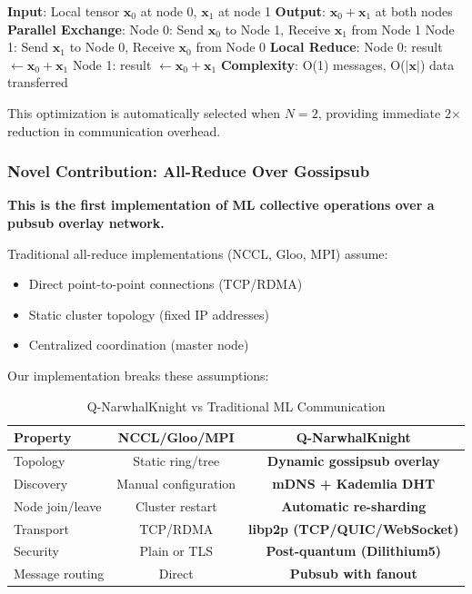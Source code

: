 \documentclass[11pt,a4paper]{article}
\newcommand{\vect}[1]{\mathbf{#1}}
\begin{document}
\begin{algorithm}[H]
\caption{2-Node Direct Exchange All-Reduce}
\begin{algorithmic}[1]
\STATE \textbf{Input}: Local tensor $\vect{x}_0$ at node 0, $\vect{x}_1$ at node 1
\STATE \textbf{Output}: $\vect{x}_0 + \vect{x}_1$ at both nodes
\STATE
\STATE \textbf{Parallel Exchange}:
\STATE Node 0: Send $\vect{x}_0$ to Node 1, Receive $\vect{x}_1$ from Node 1
\STATE Node 1: Send $\vect{x}_1$ to Node 0, Receive $\vect{x}_0$ from Node 0
\STATE
\STATE \textbf{Local Reduce}:
\STATE Node 0: result $\gets \vect{x}_0 + \vect{x}_1$
\STATE Node 1: result $\gets \vect{x}_0 + \vect{x}_1$
\STATE
\STATE \textbf{Complexity}: O(1) messages, O($|\vect{x}|$) data transferred
\end{algorithmic}
\end{algorithm}

This optimization is automatically selected when $N=2$, providing immediate 2$\times$ reduction in communication overhead.

\subsubsection{Novel Contribution: All-Reduce Over Gossipsub}

\textbf{This is the first implementation of ML collective operations over a pubsub overlay network.}

Traditional all-reduce implementations (NCCL, Gloo, MPI) assume:
\begin{itemize}[noitemsep]
    \item Direct point-to-point connections (TCP/RDMA)
    \item Static cluster topology (fixed IP addresses)
    \item Centralized coordination (master node)
\end{itemize}

Our implementation breaks these assumptions:

\begin{table}[H]
\centering
\caption{Q-NarwhalKnight vs Traditional ML Communication}
\begin{tabular}{|l|c|c|}
\hline
\textbf{Property} & \textbf{NCCL/Gloo/MPI} & \textbf{Q-NarwhalKnight} \\
\hline
Topology & Static ring/tree & \textbf{Dynamic gossipsub overlay} \\
Discovery & Manual configuration & \textbf{mDNS + Kademlia DHT} \\
Node join/leave & Cluster restart & \textbf{Automatic re-sharding} \\
Transport & TCP/RDMA & \textbf{libp2p (TCP/QUIC/WebSocket)} \\
Security & Plain or TLS & \textbf{Post-quantum (Dilithium5)} \\
Message routing & Direct & \textbf{Pubsub with fanout} \\
\hline
\end{tabular}
\end{table}
\end{document}

